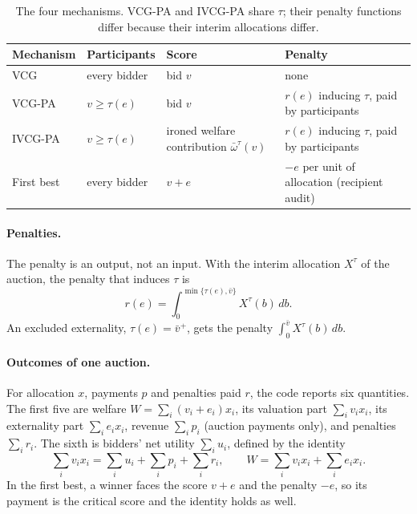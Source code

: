 \documentclass[11pt]{article}
\newcommand{\vplus}{\bar v^{+}}
\begin{document}
\begin{table}[ht]
\centering\small
\begin{tabularx}{\linewidth}{@{}l l l L@{}}
\toprule
Mechanism & Participants & Score & Penalty \\
\midrule
VCG & every bidder & bid $v$ & none \\
VCG-PA & $v\geq\tau(e)$ & bid $v$ & $r(e)$ inducing $\tau$, paid by participants \\
IVCG-PA & $v\geq\tau(e)$ & ironed welfare contribution $\bar\omega^\tau(v)$ & $r(e)$ inducing $\tau$, paid by participants \\
First best & every bidder & $v+e$ & $-e$ per unit of allocation (recipient audit) \\
\bottomrule
\end{tabularx}
\caption{The four mechanisms. VCG-PA and IVCG-PA share $\tau$; their penalty functions differ because their interim allocations differ.}
\label{tab:mechanisms}
\end{table}

\paragraph{Penalties.} The penalty is an output, not an input. With the interim allocation $X^\tau$ of the auction, the penalty that induces $\tau$ is
\[
r(e)=\int_0^{\min\{\tau(e),\bar v\}}X^\tau(b)\,db .
\]
An excluded externality, $\tau(e)=\vplus$, gets the penalty $\int_0^{\bar v}X^\tau(b)\,db$.

\paragraph{Outcomes of one auction.} For allocation $x$, payments $p$ and penalties paid $r$, the code reports six quantities. The first five are welfare $W=\sum_i(v_i+e_i)x_i$, its valuation part $\sum_iv_ix_i$, its externality part $\sum_ie_ix_i$, revenue $\sum_ip_i$ (auction payments only), and penalties $\sum_ir_i$. The sixth is bidders' net utility $\sum_iu_i$, defined by the identity
\[
\textstyle\sum_iv_ix_i=\sum_iu_i+\sum_ip_i+\sum_ir_i,\qquad W=\sum_iv_ix_i+\sum_ie_ix_i .
\]
In the first best, a winner faces the score $v+e$ and the penalty $-e$, so its payment is the critical score and the identity holds as well.
\end{document}
